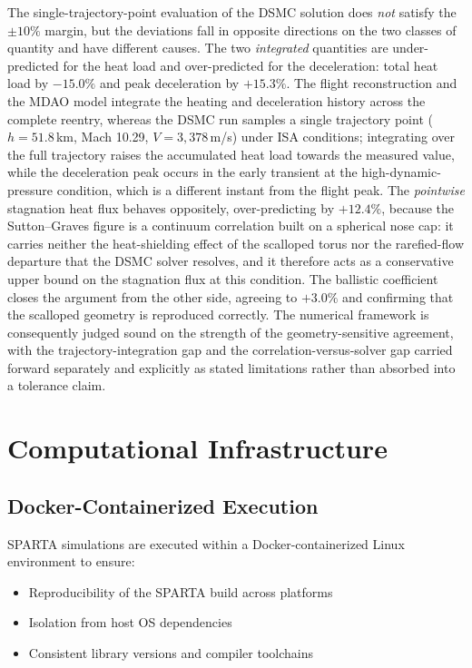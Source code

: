 The single-trajectory-point evaluation of the DSMC solution does \emph{not} satisfy the $\pm 10\%$ margin, but the deviations fall in opposite directions on the two classes of quantity and have different causes. The two \emph{integrated} quantities are under-predicted for the heat load and over-predicted for the deceleration: total heat load by $-15.0\%$ and peak deceleration by $+15.3\%$. The flight reconstruction and the MDAO model integrate the heating and deceleration history across the complete reentry, whereas the DSMC run samples a single trajectory point ($h = 51.8$\,km, Mach 10.29, $V = 3{,}378$\,m/s) under ISA conditions; integrating over the full trajectory raises the accumulated heat load towards the measured value, while the deceleration peak occurs in the early transient at the high-dynamic-pressure condition, which is a different instant from the flight peak. The \emph{pointwise} stagnation heat flux behaves oppositely, over-predicting by $+12.4\%$, because the Sutton--Graves figure is a continuum correlation built on a spherical nose cap: it carries neither the heat-shielding effect of the scalloped torus nor the rarefied-flow departure that the DSMC solver resolves, and it therefore acts as a conservative upper bound on the stagnation flux at this condition. The ballistic coefficient closes the argument from the other side, agreeing to $+3.0\%$ and confirming that the scalloped geometry is reproduced correctly. The numerical framework is consequently judged sound on the strength of the geometry-sensitive agreement, with the trajectory-integration gap and the correlation-versus-solver gap carried forward separately and explicitly as stated limitations rather than absorbed into a tolerance claim.

\section{Computational Infrastructure}

\subsection{Docker-Containerized Execution}
SPARTA simulations are executed within a Docker-containerized Linux environment to ensure:
\begin{itemize}
    \item Reproducibility of the SPARTA build across platforms
    \item Isolation from host OS dependencies
    \item Consistent library versions and compiler toolchains
\end{itemize}

